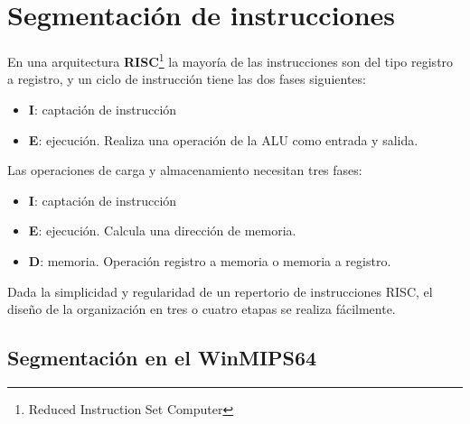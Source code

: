 \section{Segmentación de instrucciones}

En una arquitectura \textbf{RISC}\footnote{Reduced Instruction Set Computer} la mayoría de las instrucciones son del tipo registro a registro, y un ciclo de instrucción tiene las dos fases siguientes:

\begin{itemize}
  \item \textbf{I}: captación de instrucción
  \item \textbf{E}: ejecución. Realiza una operación de la ALU como entrada y salida.
\end{itemize}

Las operaciones de carga y almacenamiento necesitan tres fases:

\begin{itemize}
  \item \textbf{I}: captación de instrucción
  \item \textbf{E}: ejecución. Calcula una dirección de memoria.
  \item \textbf{D}: memoria. Operación registro a memoria o memoria a registro.
\end{itemize}

Dada la simplicidad y regularidad de un repertorio de instrucciones RISC, el diseño de la organización en tres o cuatro etapas se realiza fácilmente. 

\subsection{Segmentación en el WinMIPS64}

